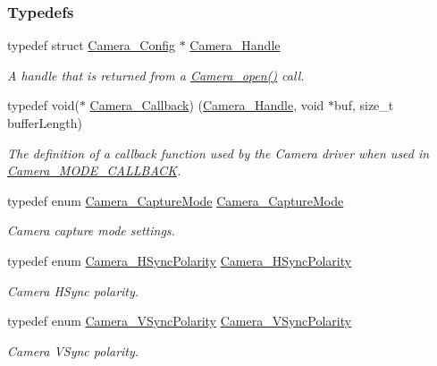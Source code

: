 \subsubsection*{Typedefs}
\begin{DoxyCompactItemize}
\item 
typedef struct \hyperlink{struct_camera___config}{Camera\+\_\+\+Config} $\ast$ \hyperlink{_camera_8h_a68ce39c29bb7acaf6a7180bb6d6a7d06}{Camera\+\_\+\+Handle}
\begin{DoxyCompactList}\small\item\em A handle that is returned from a \hyperlink{_camera_8h_a5bd1f515c97e0f598ff554c663bc6cde}{Camera\+\_\+open()} call. \end{DoxyCompactList}\item 
typedef void($\ast$ \hyperlink{_camera_8h_ad70b3ced1706386d1a093a0bf659bd87}{Camera\+\_\+\+Callback}) (\hyperlink{_camera_8h_a68ce39c29bb7acaf6a7180bb6d6a7d06}{Camera\+\_\+\+Handle}, void $\ast$buf, size\+\_\+t buffer\+Length)
\begin{DoxyCompactList}\small\item\em The definition of a callback function used by the Camera driver when used in \hyperlink{_camera_8h_a74c8a8a13eebddea16c33c726d096ba8ae2f15a1a358226aa81d59509f5a31191}{Camera\+\_\+\+M\+O\+D\+E\+\_\+\+C\+A\+L\+L\+B\+A\+C\+K}. \end{DoxyCompactList}\item 
typedef enum \hyperlink{_camera_8h_a74c8a8a13eebddea16c33c726d096ba8}{Camera\+\_\+\+Capture\+Mode} \hyperlink{_camera_8h_a02bf4fcba941f4fccb7ac818766fb3ec}{Camera\+\_\+\+Capture\+Mode}
\begin{DoxyCompactList}\small\item\em Camera capture mode settings. \end{DoxyCompactList}\item 
typedef enum \hyperlink{_camera_8h_a44b110de33cc32adba6d4a5807665987}{Camera\+\_\+\+H\+Sync\+Polarity} \hyperlink{_camera_8h_a14ac7b5f97839774d4cb487bd46dd6bd}{Camera\+\_\+\+H\+Sync\+Polarity}
\begin{DoxyCompactList}\small\item\em Camera H\+Sync polarity. \end{DoxyCompactList}\item 
typedef enum \hyperlink{_camera_8h_a05347818dd7d8986a24a0fe1bc74d412}{Camera\+\_\+\+V\+Sync\+Polarity} \hyperlink{_camera_8h_a90add9e430e82761a9b6846df9cbd0c3}{Camera\+\_\+\+V\+Sync\+Polarity}
\begin{DoxyCompactList}\small\item\em Camera V\+Sync polarity. \end{DoxyCompactList}\item 

\end{DoxyCompactItemize}
